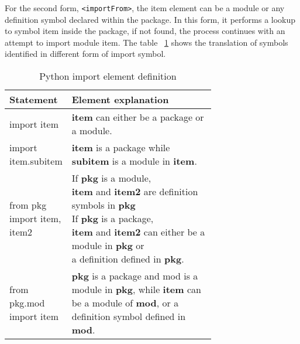 For the second form, \texttt{<importFrom>}, the item element can be a module or any definition symbol declared within the package. In this form, it performs a lookup to symbol item inside the package, if not found, the process continues with an attempt to import module item. The table ~\ref{table:python-import-def} shows the translation of symbols identified in different form of import symbol.

\begin{table}[ht]
    \centering
    \begin{tabular}{ |l|p{0.7\linewidth}| }
        \hline
        Statement                   & Element explanation                                                                                                                                                 \\
        \hline
        import item                 & \textbf{item} can either be a package or a module.                                                                                                                  \\
        \hline
        import item.subitem         & \textbf{item} is a package while \textbf{subitem} is a module in \textbf{item}.                                                                                     \\
        \hline
        from pkg import item, item2 &
        \makecell[l]
        {If \textbf{pkg} is a module,                                                                                                                                                                     \\ \textbf{item} and \textbf{item2} are definition symbols in \textbf{pkg}                                                            \\
            If \textbf{pkg} is a package,                                                                                                                                                                 \\ \textbf{item} and \textbf{item2} can either be a module in \textbf{pkg} or \\ a definition defined in \textbf{pkg}.
        }                                                                                                                                                                                                 \\
        \hline
        from pkg.mod import item    & \textbf{pkg} is a package and mod is a module in \textbf{pkg}, while \textbf{item} can be a module of \textbf{mod}, or a definition symbol defined in \textbf{mod}. \\
        \hline
    \end{tabular}
    \caption{Python import element definition}
    \label{table:python-import-def}
\end{table}

